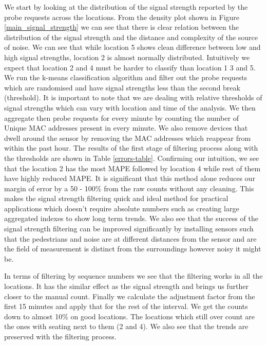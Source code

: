 We start by looking at the distribution of the signal strength reported by the probe requests across the locations. From the density plot shown in Figure \ref{main_signal_strength} we can see that there is clear relation between the distribution of the signal strength and the distance and complexity of the source of noise. We can see that while location 5 shows clean difference between low and high signal strengths, location 2 is almost normally distributed.
Intuitively we expect that location 2 and 4 must be harder to classify than location 1 3 and 5. 
We run the k-means classification algorithm and filter out the probe requests which are randomised and have signal strengths less than the second break (threshold). 
It is important to note that we are dealing with relative thresholds of signal strengths which can vary with location and time of the analysis.
We then aggregate then probe requests for every minute by counting the number of Unique MAC addresses present in every minute. We also remove devices that dwell around the sensor by removing the MAC addresses which reappear from within the past hour.
The results of the first stage of filtering process along with the thresholds are shown in Table \ref{errors-table}. Confirming our intuition, we see that the location 2 has the most MAPE followed by location 4 while rest of them have highly reduced MAPE.
It is significant that this method alone reduces our margin of error by a 50 - 100\% from the raw counts without any cleaning.
This makes the signal strength filtering quick and ideal method for practical applications which doesn't require absolute numbers such as creating large aggregated indexes to show long term trends. 
We also see that the success of the signal strength filtering can be improved significantly by installing sensors such that the pedestrians and noise are at different distances from the sensor and are the field of measurement is distinct from the surroundings however noisy it might be.

In terms of filtering by sequence numbers we see that the filtering works in all the locations. It has the similar effect as the signal strength and brings us further closer to the manual count. Finally we calculate the adjustment factor from the first 15 minutes and apply that for the rest of the interval. We get the counts down to almost 10\% on good locations. The locations which still over count are the ones with seating next to them (2 and 4). We also see that the trends are preserved with the filtering process.

